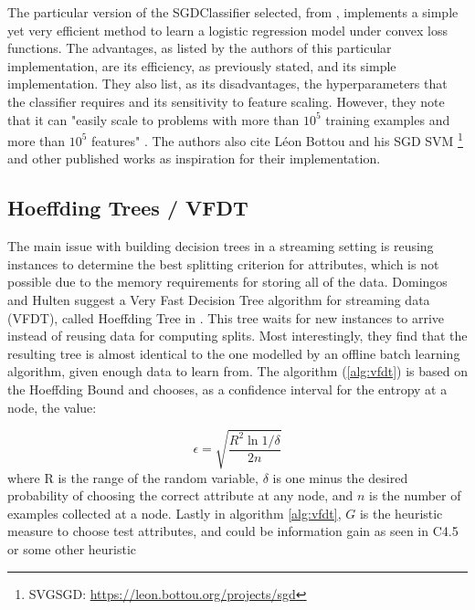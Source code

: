 The particular version of the SGDClassifier selected, from \cite{scikit-learn}, implements a simple yet very efficient method to learn a logistic regression model under convex loss functions. The advantages, as listed by the authors of this particular implementation, are its efficiency, as previously stated, and its simple implementation. They also list, as its disadvantages, the hyperparameters that the classifier requires and its sensitivity to feature scaling. However, they note that it can "easily scale to problems with more than $10^5$ training examples and more than $10^5$ features" \cite{scikit-learn-sgd}. The authors also cite Léon Bottou and his SGD SVM \cite{bottou2008learning}\footnote{SVGSGD: \url{https://leon.bottou.org/projects/sgd}} and other published works \cite{tsuruoka2009stochastic, shalev2011pegasos} as inspiration for their implementation.

\subsection{Hoeffding Trees / VFDT}
The main issue with building decision trees in a streaming setting is reusing instances to determine the best splitting criterion for attributes, which is not possible due to the memory requirements for storing all of the data. Domingos and Hulten suggest a Very Fast Decision Tree algorithm for streaming data (VFDT), called Hoeffding Tree in \cite{domingos2000mining}. This tree waits for new instances to arrive instead of reusing data for computing splits. Most interestingly, they find that the resulting tree is almost identical to the one modelled by an offline batch learning algorithm, given enough data to learn from. The algorithm (\ref{alg:vfdt}) is based on the Hoeffding Bound and chooses, as a confidence interval for the entropy at a node, the value:

\begin{equation}
\epsilon=\sqrt{\frac{R^{2} \ln 1 / \delta}{2 n}}
\end{equation}
where R is the range of the random variable, $\delta$ is one minus the desired probability of choosing the correct attribute at any node, and $n$ is the number of examples collected at a node. Lastly in algorithm \ref{alg:vfdt}, $G$ is the heuristic measure to choose test attributes, and could be information gain as seen in C4.5 or some other heuristic \cite{bifet2018machine, domingos2000mining, }

